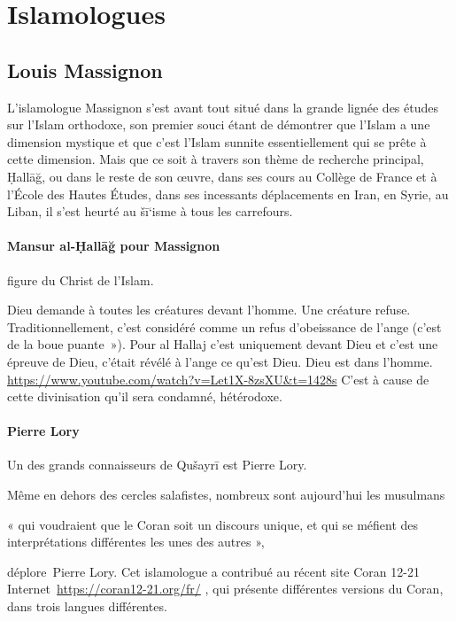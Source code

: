\section{Islamologues}

\subsection{Louis Massignon}


L’islamologue Massignon s’est avant tout situé dans la grande lignée des études sur l’Islam orthodoxe, son premier souci étant de démontrer que l’Islam a une dimension mystique et que c’est l’Islam sunnite essentiellement qui se prête à cette dimension. Mais que ce soit à travers son thème de recherche principal, Ḥallāğ, ou dans le reste de son œuvre, dans ses cours au Collège de France et à l’École des Hautes Études, dans ses incessants déplacements en Iran, en Syrie, au Liban, il s’est heurté au šī‘isme à tous les carrefours.

  \paragraph{Mansur al-Ḥallāğ pour Massignon} figure du Christ de l'Islam.

  Dieu demande à toutes les créatures devant l'homme. Une créature
  refuse. Traditionnellement, c'est considéré comme un refus
  d'obeissance de l'ange (c'est de la boue puante~»). Pour al Hallaj
  c'est uniquement devant Dieu et c'est une épreuve de Dieu, c'était
  révélé à l'ange ce qu'est Dieu. Dieu est dans l'homme.
  \url{https://www.youtube.com/watch?v=Let1X-8zsXU\&t=1428s}
  C'est à cause de cette divinisation qu'il sera condamné, hétérodoxe.

\paragraph{Pierre Lory}
\label{Theol:PierreLory}
Un des grands connaisseurs de Qušayrī est
Pierre Lory.

Même en dehors des cercles salafistes, nombreux sont aujourd'hui les
musulmans~

\begin{cite}
« qui voudraient que le Coran soit un discours unique,
et qui se méfient des interprétations différentes les unes des autres
»,~
\end{cite}
\emph{}déplore~{{Pierre
Lory}}. Cet islamologue a contribué au récent site {{Coran 12-21}}
Internet~\url{https://coran12-21.org/fr/} , qui
présente différentes versions du Coran, dans trois langues différentes.

